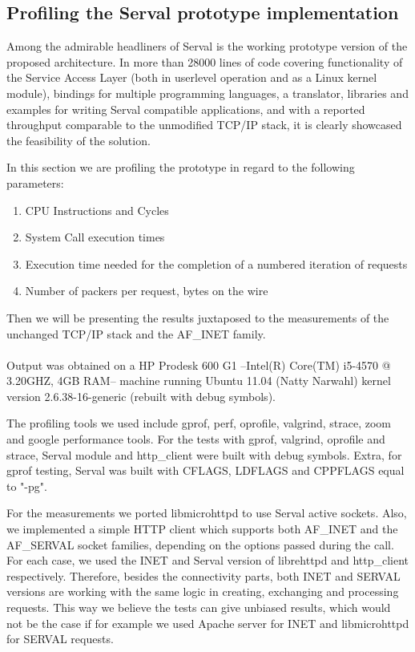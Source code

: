 \newpage
\subsection{Profiling the Serval prototype implementation}
Among the admirable headliners of Serval is the working prototype version of the proposed architecture.
In more than 28000 lines of code covering functionality of the Service Access Layer (both in userlevel operation and as a Linux kernel module), bindings for multiple programming languages, a translator, libraries and examples for writing Serval compatible applications, and with a reported throughput comparable to the unmodified TCP/IP stack, it is clearly showcased the feasibility of the solution.



In this section we are profiling the prototype in regard to the following parameters:
\begin{enumerate} \itemsep1pt \parskip0pt 
  \item CPU Instructions and Cycles
  \item System Call execution times
  \item Execution time needed for the completion of a numbered iteration of requests
  \item Number of packers per request, bytes on the wire
\end{enumerate}
Then we will be presenting the results juxtaposed to the measurements of the unchanged TCP/IP stack and the AF\_INET family.

\paragraph{} Output was obtained on a HP Prodesk 600 G1 --Intel(R) Core(TM) i5-4570 @ 3.20GHZ, 4GB RAM-- machine running Ubuntu 11.04 (Natty Narwahl) kernel version 2.6.38-16-generic (rebuilt with debug symbols).

The profiling tools we used include gprof, perf, oprofile, valgrind, strace, zoom and google performance tools.
For the tests with gprof, valgrind, oprofile and strace, Serval module and http\_client were built with debug symbols.
Extra, for gprof testing, Serval was built with CFLAGS, LDFLAGS and CPPFLAGS equal to "-pg".

For the measurements we ported libmicrohttpd to use Serval active sockets.
Also, we implemented a simple HTTP client which supports both AF\_INET and the AF\_SERVAL socket families, depending on the options passed during the call.
For each case, we used the INET and Serval version of librehttpd and http\_client respectively.
Therefore, besides the connectivity parts, both INET and SERVAL versions are working with the same logic in creating, exchanging and processing requests.
This way we believe the tests can give unbiased results, which would not be the case if for example we used Apache server for INET and libmicrohttpd for SERVAL requests.

